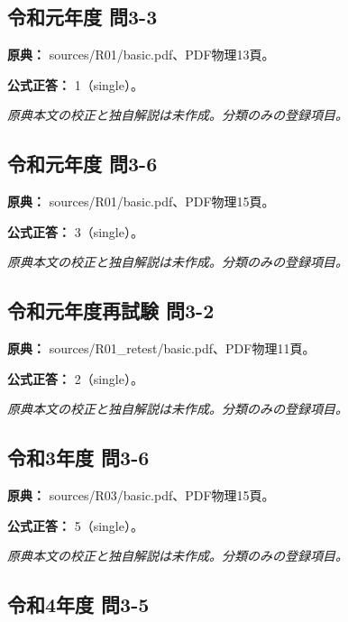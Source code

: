 \subsection{令和元年度 問3-3}
\label{q:r01-reg-basic-3-3}

\noindent\textbf{原典：} sources/R01/basic.pdf、PDF物理13頁。

\textbf{公式正答：} 1（single）。

\par\textit{原典本文の校正と独自解説は未作成。分類のみの登録項目。}

\subsection{令和元年度 問3-6}
\label{q:r01-reg-basic-3-6}

\noindent\textbf{原典：} sources/R01/basic.pdf、PDF物理15頁。

\textbf{公式正答：} 3（single）。

\par\textit{原典本文の校正と独自解説は未作成。分類のみの登録項目。}

\subsection{令和元年度再試験 問3-2}
\label{q:r01-ret-basic-3-2}

\noindent\textbf{原典：} sources/R01\_retest/basic.pdf、PDF物理11頁。

\textbf{公式正答：} 2（single）。

\par\textit{原典本文の校正と独自解説は未作成。分類のみの登録項目。}

\subsection{令和3年度 問3-6}
\label{q:r03-reg-basic-3-6}

\noindent\textbf{原典：} sources/R03/basic.pdf、PDF物理15頁。

\textbf{公式正答：} 5（single）。

\par\textit{原典本文の校正と独自解説は未作成。分類のみの登録項目。}

\subsection{令和4年度 問3-5}
\label{q:r04-reg-basic-3-5}

